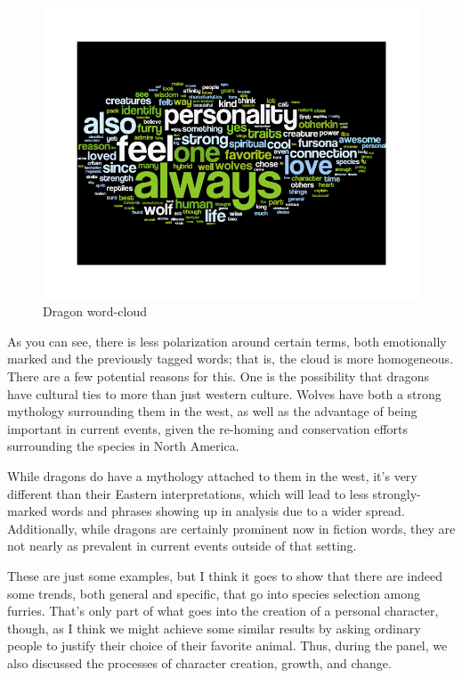 \begin{figure}
  \begin{center}
    \includegraphics[width=\textwidth]{content/assets/species--dragon}
  \end{center}
  \caption{Dragon word-cloud}
\end{figure}

As you can see, there is less polarization around certain terms, both emotionally marked and the previously tagged words; that is, the cloud is more homogeneous. There are a few potential reasons for this. One is the possibility that dragons have cultural ties to more than just western culture. Wolves have both a strong mythology surrounding them in the west, as well as the advantage of being important in current events, given the re-homing and conservation efforts surrounding the species in North America.

While dragons do have a mythology attached to them in the west, it's very different than their Eastern interpretations, which will lead to less strongly-marked words and phrases showing up in analysis due to a wider spread. Additionally, while dragons are certainly prominent now in fiction words, they are not nearly as prevalent in current events outside of that setting.

These are just some examples, but I think it goes to show that there are indeed some trends, both general and specific, that go into species selection among furries. That's only part of what goes into the creation of a personal character, though, as I think we might achieve some similar results by asking ordinary people to justify their choice of their favorite animal. Thus, during the panel, we also discussed the processes of character creation, growth, and change.


